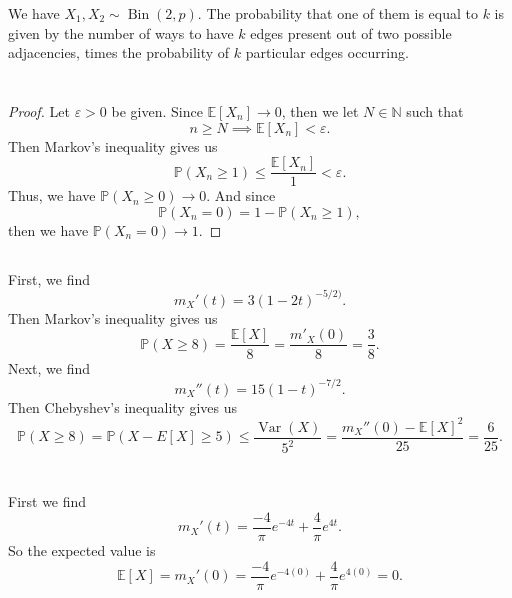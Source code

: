 \documentclass[12pt]{article}
\newcommand{\N}{\mathbb{N}}
\newcommand{\eps}{\varepsilon}
\renewcommand{\P}{\mathbb{P}}
\newcommand{\E}{\mathbb{E}}
\newcommand{\Var}{\operatorname{Var}}
\newcommand{\Bin}{\operatorname{Bin}}
\begin{document}
We have $X_1, X_2 \sim \Bin(2, p)$. The probability that one of them is equal to $k$ is given by the number of ways to have $k$ edges present out of two possible adjacencies, times the probability of $k$ particular edges occurring. 

\newpage
\section{}

\subsection{}

\begin{proof}
    Let $\eps > 0$ be given. Since $\E[X_n] \to 0$, then we let $N \in \N$ such that
    \[
        n \geq N \implies \E[X_n] < \eps.
    \]
    Then Markov's inequality gives us
    \[
        \P(X_n \geq 1) \leq \frac{\E[X_n]}{1} < \eps.
    \]
    Thus, we have $\P(X_n \geq 0) \to 0$. And since
    \[
        \P(X_n = 0) = 1 - \P(X_n \geq 1),
    \]
    then we have $\P(X_n = 0) \to 1$.
    
\end{proof}


\subsection{}

First, we find
\[
    m_X'(t) = 3(1 - 2t)^{-5/2)}.
\]
Then Markov's inequality gives us
\[
    \P(X \geq 8) = \frac{\E[X]}{8} = \frac{m'_X(0)}{8} = \frac{3}{8}.
\]
Next, we find
\[
    m_X''(t) = 15(1 - t)^{-7/2}.
\]
Then Chebyshev's inequality gives us
\[
    \P(X \geq 8) = \P(X - E[X] \geq 5) \leq \frac{\Var(X)}{5^2} = \frac{m_X''(0) - \E[X]^2}{25} = \frac{6}{25}.
\]

\newpage
\section{}

\subsection{}

First we find
\[
    m_X'(t) = \frac{-4}{\pi}e^{-4t} + \frac{4}{\pi}e^{4t}.
\]
So the expected value is
\[
    \E[X] = m_X'(0) = \frac{-4}{\pi}e^{-4(0)} + \frac{4}{\pi}e^{4(0)} = 0.
\]

\subsection{}
\end{document}
